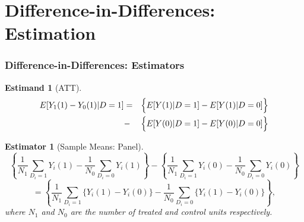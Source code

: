 \documentclass{beamer}
\numberwithin{equation}{section}
\newtheorem{estm}{Estimand}
\newtheorem{esti}{Estimator}
\begin{document}

\section{Difference-in-Differences: Estimation}


\begin{frame}
  \frametitle{Difference-in-Differences: Estimators}

\begin{estm}[ATT]\vspace{-.15in}
\begin{eqnarray*}\small
E[Y_1(1)-Y_0(1)|D=1]&=&\Bigl\{ E[Y(1)|D=1]-E[Y(1)|D=0] \Bigr\}\\
      &-&\Bigl\{ E[Y(0)|D=1]-E[Y(0)|D=0] \Bigr\}
\end{eqnarray*}
\end{estm}\vspace{-.05in}
\begin{esti}[Sample Means: Panel]\small
\[
\left\{\frac{1}{N_1}\sum_{D_i=1} Y_i(1) -
\frac{1}{N_0}\sum_{D_i=0} Y_i(1)\right\} -
\left\{\frac{1}{N_1}\sum_{D_i=1} Y_i(0) -
\frac{1}{N_0}\sum_{D_i=0} Y_i(0)\right\}
\]
\[
=\left\{\frac{1}{N_1}\sum_{D_i=1} \{Y_i(1)-Y_i(0)\} -
\frac{1}{N_0}\sum_{D_i=0} \{Y_i(1)-Y_i(0)\}\right\},
\]
where $N_1$ and $N_0$ are the number of treated and control units respectively.
\end{esti}
\end{frame}
\end{document}
